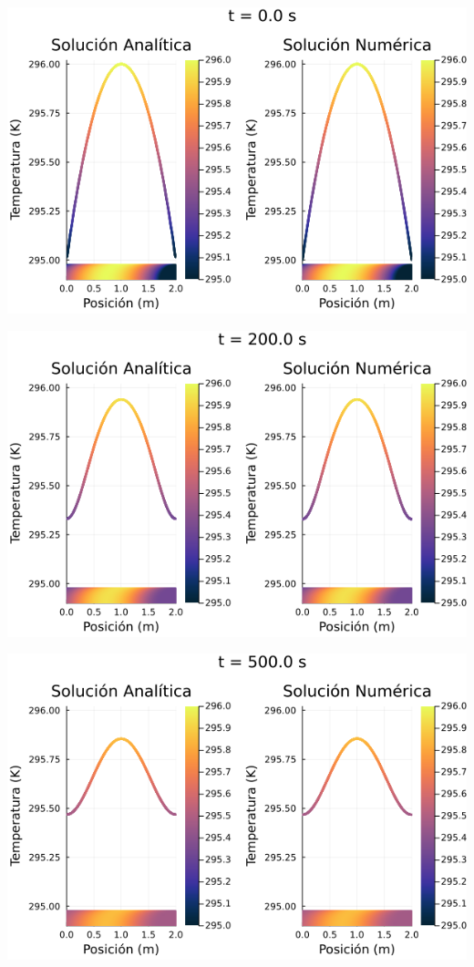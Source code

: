 \documentclass[12pt]{article}
\begin{document}
\begin{center}
    \includegraphics[width=1\linewidth]{Ejemplo_02_t_0.png}
\end{center}

\begin{center}
    \includegraphics[width=1\linewidth]{Ejemplo_02_t_1.png}
\end{center}

\begin{center}
    \includegraphics[width=1\linewidth]{Ejemplo_02_t_2.png}
\end{center}
\end{document}

